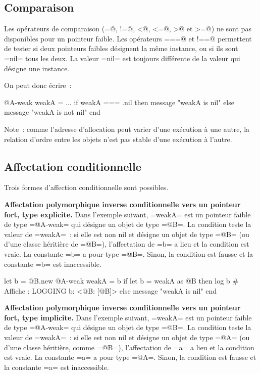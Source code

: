 \subsection{Comparaison}

Les opérateurs de comparaison (\ggs@=@, \ggs@!=@, \ggs@<@, \ggs@<=@, \ggs@>@ et \ggs@>=@) ne sont pas disponibles pour un pointeur faible. Les opérateurs \ggs@===@ et \ggs@!==@ permettent de tester si deux pointeurs faibles désignent la même instance, ou si ils sont \ggs=nil= tous les deux. La valeur \ggs=nil= est toujours différente de la valeur qui désigne une instance.


On peut donc écrire~:
\begin{galgas}
  @A-weak weakA = ...
  if weakA === .nil then
    message "weakA is nil\n"
  else
    message "weakA is not nil\n"
  end
\end{galgas}


Note~: comme l'adresse d'allocation peut varier d'une exécution à une autre, la relation d'ordre entre les objets n'est pas stable d'une exécution à l'autre.




\subsection{Affectation conditionnelle}

Trois formes d'affection conditionnelle sont possibles.

{\bf Affectation polymorphique inverse conditionnelle vers un pointeur fort, type explicite.}  Dans l'exemple suivant, \ggs=weakA= est un pointeur faible de type \ggs=@A-weak= qui désigne un objet de type \ggs=@B=. La condition teste la valeur de \ggs=weakA=~: si elle est non nil et désigne un objet de type \ggs=@B= (ou d'une classe héritière de \ggs=@B=), l'affectation de \ggs=b= a lieu et la condition est vraie. La constante \ggs=b= a pour type \ggs=@B=. Sinon, la condition est fausse et la constante \ggs=b= est inaccessible.

\begin{galgas}
  let b = @B.new
  @A-weak weakA = b
  if let b = weakA as @B then
    log b # Affiche : LOGGING b: <@B: [@B]>
  else
    message "weakA is nil\n"
  end
\end{galgas}


{\bf Affectation polymorphique inverse conditionnelle vers un pointeur fort, type implicite.}  Dans l'exemple suivant, \ggs=weakA= est un pointeur faible de type \ggs=@A-weak= qui désigne un objet de type \ggs=@B=. La condition teste la valeur de \ggs=weakA=~: si elle est non nil et désigne un objet de type \ggs=@A= (ou d'une classe héritière, comme \ggs=@B=), l'affectation de \ggs=a= a lieu et la condition est vraie. La constante \ggs=a= a pour type \ggs=@A=. Sinon, la condition est fausse et la constante \ggs=a= est inaccessible.

